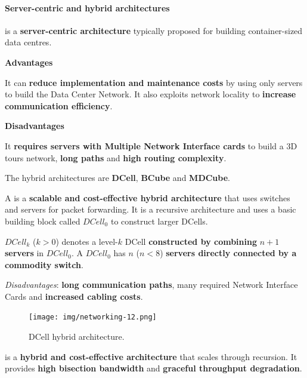 \newpage

\paragraph{Server-centric and hybrid architectures}

 is a \textbf{server-centric architecture} typically proposed for building container-sized data centres.

\highspace
\begin{flushleft}
    \textcolor{Green3}{ \textbf{Advantages}}
\end{flushleft}
It can \textbf{reduce implementation and maintenance costs} by using only servers to build the Data Center Network. It also exploits network locality to \textbf{increase communication efficiency}.

\highspace
\begin{flushleft}
    \textcolor{Red2}{ \textbf{Disadvantages}}
\end{flushleft}
It \textbf{requires servers with Multiple Network Interface cards} to build a 3D tours network, \textbf{long paths} and \textbf{high routing complexity}.

\highspace
The hybrid architectures are \textbf{DCell}, \textbf{BCube} and \textbf{MDCube}.

\highspace
A  is a \textbf{scalable and cost-effective hybrid architecture} that uses switches and servers for packet forwarding. It is a recursive architecture and uses a basic building block called $DCell_{0}$ to construct larger DCells.

\highspace
$DCell_{k}$ ($k > 0$) denotes a level-$k$ DCell \textbf{constructed by combining} $n+1$ \textbf{servers} in $DCell_{0}$. A $DCell_{0}$ has $n$ ($n < 8$) \textbf{servers directly connected by a commodity switch}.

\highspace
\emph{Disadvantages}: \textbf{long communication paths}, many required Network Interface Cards and \textbf{increased cabling costs}.

\begin{figure}[!htp]
    \centering
    \texttt{[image: img/networking-12.png]}
    \caption{DCell hybrid architecture.}
\end{figure}

\newpage

\noindent
{} is a \textbf{hybrid and cost-effective architecture} that scales through recursion. It provides \textbf{high bisection bandwidth} and \textbf{graceful throughput degradation}.

